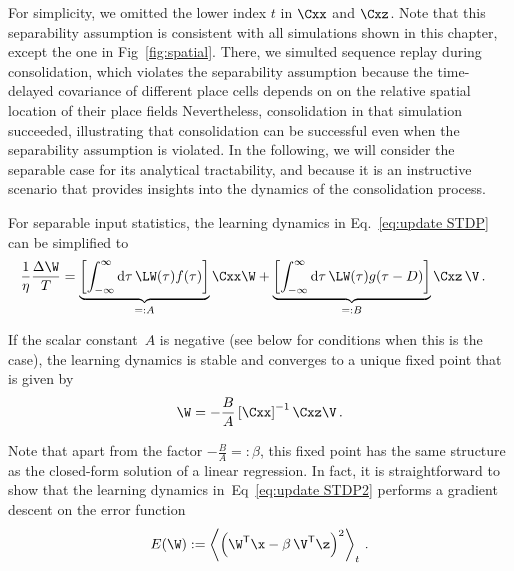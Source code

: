 \noindent
For simplicity, we omitted the lower index $t$ in $\Cxx$ and $\Cxz$.
Note that this separability assumption is consistent with all simulations shown in this chapter, except the one in Fig~\ref{fig:spatial}. There, we simulted sequence replay during consolidation, which violates the separability assumption because the time-delayed covariance of different place cells depends on on the relative spatial location of their place fields Nevertheless, consolidation in that simulation succeeded, illustrating that consolidation can be successful even when the separability assumption is violated. In the following, we will consider the separable case for its analytical tractability, and because it is an instructive scenario that provides insights into the dynamics of the consolidation process.

For separable input statistics, the learning dynamics in Eq.~\eqref{eq:update STDP} can be simplified to
\begin{align}
\frac{1}{\eta} \frac{\Delta \W}{T} & =
\underbrace{\left[\int_{-\infty}^{\infty} \mathrm {d} \tau\, \LW(\tau) f(\tau) \right]}_{=:A} \Cxx \W + \underbrace{\left[\int_{-\infty}^{\infty} \mathrm{d} \tau \,\LW(\tau) g(\tau-D)\right]}_{=:B}\Cxz \, \V \,. \label{eq:update STDP2}
\end{align}

\noindent
If the scalar constant~$A$ is negative (see below for conditions when this is the case), the learning dynamics is stable and converges to a unique fixed point that is given by
\begin{align}
\W = - \frac{B}{A} \left[ \Cxx \right]^{-1} \Cxz \V \,. \label{eq:fixed point dynamics}
\end{align}

\noindent
Note that apart from the factor $- \frac{B}{A} =: \beta$, this fixed point has the same structure as the closed-form solution of a linear regression. In fact, it is straightforward to show that the learning dynamics in~Eq~\eqref{eq:update STDP2} performs a gradient descent on the error function
\begin{align}
E(\W) := \left  \langle \left( \W^\mathsf{T} \x - \beta\, \V^\mathsf{T} \z \right)^2 \right \rangle_t \,. \label{eq:error function dynamics}
\end{align}

